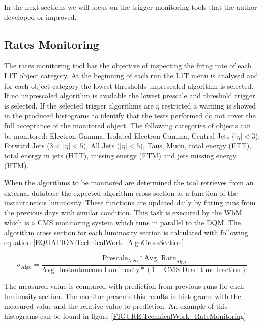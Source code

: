 In the next sections we will focus on the trigger monitoring tools that the author developed or improved.

\subsection{Rates Monitoring}
\label{SECTION:TechnicalWork_L1TDQM_RatesMonitoring}


The rates monitoring tool has the objective of inspecting the firing rate of each \gls{L1T} object category. At the beginning of each run the \gls{L1T} menu is analysed and for each object category the lowest thresholds unprescaled algorithm is selected. If no unprescaled algorithm is available the lowest prescale and threshold trigger is selected. If the selected trigger algorithms are $\eta$ restricted a warning is showed in the produced histograms to identify that the tests performed do not cover the full acceptance of the monitored object. The following categories of objects can be monitored: Electron-Gamma, Isolated Electron-Gamma, Central Jets ($|\eta|<3$), Forward Jets ($3<|\eta|<5$), All Jets ($|\eta|<5$), Taus, Muon, total energy (ETT), total energy in jets (HTT), missing energy (ETM) and jets missing energy (HTM).

When the algorithms to be monitored are determined the tool retrieves from an external database the expected algorithm cross section as a function of the instantaneous luminosity. These functions are updated daily by fitting runs from the previous days with similar condition. This task is executed by the \gls{WbM} which is a \gls{CMS} monitoring system which runs in parallel to the \gls{DQM}. The algorithm cross section for each luminosity section is calculated with following equation \ref{EQUATION:TechnicalWork_AlgoCrossSection}.

\begin{equation}
\sigma_{\text{Algo}}=\frac{\text{Prescale}_{\text{Algo}}*{\text{Avg. Rate}_{\text{Algo}}}}{\text{Avg. Instantaneous Luminosity}*(1-\text{CMS Dead time fraction})}
\label{EQUATION:TechnicalWork_AlgoCrossSection}
\end{equation}

The measured value is compared with prediction from previous runs for each luminosity section. The monitor presents this results in histograms with the measured value and the relative value to prediction. An example of this histograms can be found in figure \ref{FIGURE:TechnicalWork_RateMonitoring}

